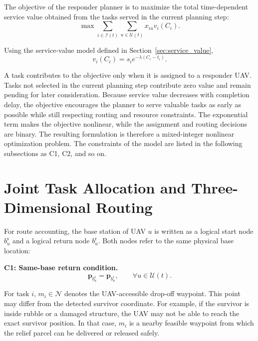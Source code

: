 The objective of the responder planner is to maximize the total
time-dependent service value obtained from the tasks served in the current
planning step:
\begin{equation}
\max
\sum_{i\in\mathcal{I}(t)}
\sum_{u\in\mathcal{U}(t)}
x_{iu}v_i(C_i).
\end{equation}

Using the service-value model defined in Section~\ref{sec:service_value},
\begin{equation}
v_i(C_i)
=
s_i
e^{-\lambda(C_i-t_i)}.
\end{equation}

A task contributes to the objective only when it is assigned to a responder
UAV. Tasks not selected in the current planning step contribute zero value and
remain pending for later consideration. Because service value decreases with
completion delay, the objective encourages the planner to serve valuable tasks
as early as possible while still respecting routing and resource constraints.
The exponential term makes the objective nonlinear, while the assignment and
routing decisions are binary. The resulting formulation is therefore a
mixed-integer nonlinear optimization problem. The constraints of the model are
listed in the following subsections as C1, C2, and so on.

\section{Joint Task Allocation and Three-Dimensional Routing}

For route accounting, the base station of UAV $u$ is written as a logical
start node $b_u^{\mathrm{s}}$ and a logical return node $b_u^{\mathrm{r}}$.
Both nodes refer to the same physical base location:

\noindent\textbf{C1: Same-base return condition.}
\begin{equation*}
\mathbf{p}_{b_u^{\mathrm{s}}}
=
\mathbf{p}_{b_u^{\mathrm{r}}},
\qquad
\forall u\in\mathcal{U}(t).
\end{equation*}

For task $i$, $m_i\in\mathcal{N}$ denotes the UAV-accessible drop-off
waypoint. This point may differ from the detected survivor coordinate. For
example, if the survivor is inside rubble or a damaged structure, the UAV may
not be able to reach the exact survivor position. In that case, $m_i$ is a
nearby feasible waypoint from which the relief parcel can be delivered or
released safely.

